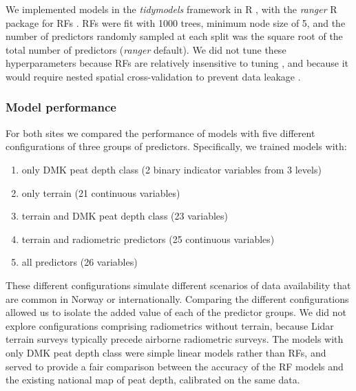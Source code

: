 \documentclass[soil, manuscript]{copernicus}
\providecommand{\tightlist}{%
  \setlength{\itemsep}{0pt}\setlength{\parskip}{0pt}}
\begin{document}
We implemented models in the \emph{tidymodels} framework in R \citep{kuhnTidymodelsCollectionPackages2020}, with the \emph{ranger} R package for RFs \citep[v.0.16,][]{wrightRangerFastImplementation2017}.
RFs were fit with 1000 trees, minimum node size of 5, and the number of predictors randomly sampled at each split was the square root of the total number of predictors (\emph{ranger} default).
We did not tune these hyperparameters because RFs are relatively insensitive to tuning \citep{probstHyperparametersTuningStrategies2019}, and because it would require nested spatial cross-validation to prevent data leakage \citep{schratzHyperparameterTuningPerformance2019}.

\subsubsection{Model performance}

For both sites we compared the performance of models with five different configurations of three groups of predictors.
Specifically, we trained models with:

\begin{enumerate}
\def\labelenumi{\arabic{enumi}.}
\tightlist
\item
  only DMK peat depth class (2 binary indicator variables from 3 levels)
\item
  only terrain (21 continuous variables)
\item
  terrain and DMK peat depth class (23 variables)
\item
  terrain and radiometric predictors (25 continuous variables)
\item
  all predictors (26 variables)
\end{enumerate}

These different configurations simulate different scenarios of data availability that are common in Norway or internationally.
Comparing the different configurations allowed us to isolate the added value of each of the predictor groups.
We did not explore configurations comprising radiometrics without terrain, because Lidar terrain surveys typically precede airborne radiometric surveys.
The models with only DMK peat depth class were simple linear models rather than RFs, and served to provide a fair comparison between the accuracy of the RF models and the existing national map of peat depth, calibrated on the same data.
\end{document}
